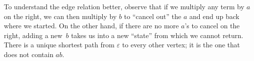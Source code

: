 \documentclass[../generics]{subfiles}
\begin{document}
\begin{example}
\begin{center}
\end{center}

To understand the edge relation better, observe that if we multiply any term by $a$ on the right, we can then multiply by $b$ to ``cancel out'' the $a$ and end up back where we started. On the other hand, if there are no more $a$'s to cancel on the right, adding a new~$b$ takes us into a new ``state'' from which we cannot return. There is a unique shortest path from $\varepsilon$ to every other vertex; it is the one that does not contain $ab$.
\end{example}
\end{document}
